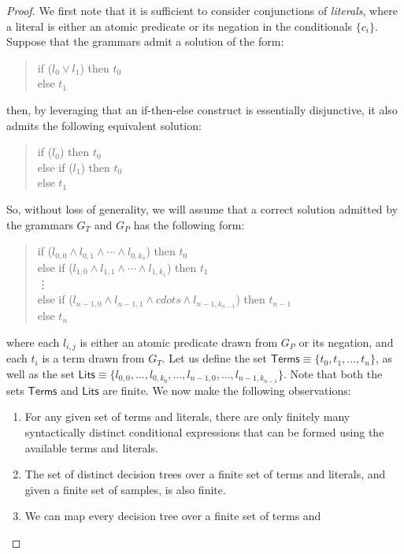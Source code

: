\begin{proof}
We first note that it is sufficient to consider conjunctions of
\emph{literals}, where a literal is either an atomic predicate or its
negation in the conditionals $\{c_i\}$. Suppose that the grammars
admit a solution of the form:
\begin{quote}
\centering
\tabbedcode{\linewidth}{\small} {
if ($l_0 \vee l_1$) then $t_0$\\
else $t_1$
}
\end{quote}
then, by leveraging that an if-then-else construct is essentially
disjunctive, it also admits the following equivalent solution:
\begin{quote}
\centering
\tabbedcode{\linewidth}{\small} {
if ($l_0$) then $t_0$\\
else if ($l_1$) then $t_0$\\
else $t_1$
}
\end{quote}
So, without loss of generality, we will assume that a correct solution
admitted by the grammars $G_T$ and $G_P$ has the following form:
\begin{quote}
\centering
\tabbedcode{\linewidth}{\small} {
if ($l_{0,0} \wedge l_{0,1} \wedge \cdots \wedge l_{0,k_0}$) then $t_0$\\
else if ($l_{1,0} \wedge l_{1,1} \wedge \cdots \wedge l_{1,k_1}$) then $t_1$\\
\vdots\\
else if ($l_{n-1,0} \wedge l_{n-1, 1} \wedge cdots \wedge l_{n-1,k_{n-1}}$) then $t_{n-1}$\\
else $t_n$
}
\end{quote}
where each $l_{i,j}$ is either an atomic predicate drawn from $G_P$ or
its negation, and each $t_i$ is a term drawn from $G_T$. Let us define
the set $\mathsf{Terms} \equiv \{t_0, t_1, \ldots, t_n\}$, as well as
the set $\mathsf{Lits} \equiv \{l_{0,0}, \ldots, l_{0, k_0}, \ldots, l_{n-1,
  0}, \ldots, l_{n-1, k_{n-1}}\}$. Note that both the sets
$\mathsf{Terms}$ and $\mathsf{Lits}$ are finite. We now make the
following observations:
\begin{enumerate}
\item
For any given set of terms and literals, there are only finitely many
syntactically distinct conditional expressions that can be formed
using the available terms and literals.
\item
The set of distinct decision trees over a finite set of terms and
literals, and given a finite set of samples, is also finite.
\item
We can map every decision tree over a finite set of terms and

\end{enumerate}
\end{proof}
